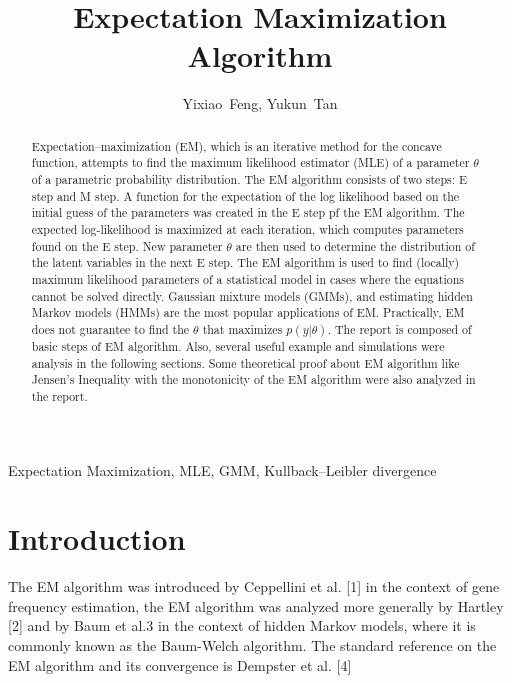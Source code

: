 \documentclass[onecolumn,12pt]{IEEEtran}
\begin{document}
\title{Expectation Maximization Algorithm}

\author{Yixiao~Feng, Yukun~Tan}

\maketitle

\begin{abstract}
  Expectation–maximization (EM), which is an iterative method for the concave function, attempts to find the maximum likelihood estimator (MLE) of a parameter $\theta$ of a parametric probability distribution. The EM algorithm consists of two steps: E step and M step. A function for the expectation of the log likelihood based on the initial guess of the parameters was created in the E step pf the EM algorithm. The expected log-likelihood is maximized at each iteration, which computes parameters found on the E step. New parameter $\theta$ are then used to determine the distribution of the latent variables in the next E step. The EM algorithm is used to find (locally) maximum likelihood parameters of a statistical model in cases where the equations cannot be solved directly. Gaussian mixture models (GMMs), and estimating hidden Markov models (HMMs) are the most popular applications of EM. Practically, EM does not guarantee to find the $\theta$ that maximizes $p(y|\theta)$. The report is composed of basic steps of EM algorithm. Also, several useful example and simulations were analysis in the following sections. Some theoretical proof about EM algorithm like Jensen’s Inequality with the monotonicity of the EM algorithm were also analyzed in the report. 
\end{abstract}

\begin{IEEEkeywords}
  Expectation Maximization, MLE, GMM, Kullback–Leibler divergence
\end{IEEEkeywords}

\IEEEpeerreviewmaketitle

\section{Introduction}
 The EM algorithm was introduced by Ceppellini et al. [1] in the context of gene frequency estimation, the EM algorithm was analyzed more generally by Hartley [2] and by Baum et al.3 in the context of hidden Markov models, where it is commonly known as the Baum-Welch algorithm. The standard reference on the EM algorithm and its convergence is Dempster et al. [4] 
\end{document}
